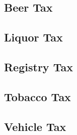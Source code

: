 \documentclass[12pt]{article}
\begin{document}
\begin{appendices}
\subsection{Beer Tax}
\subsection{Liquor Tax}
\subsection{Registry Tax}
\subsection{Tobacco Tax}
\subsection{Vehicle Tax}


\end{appendices}






\end{document}
